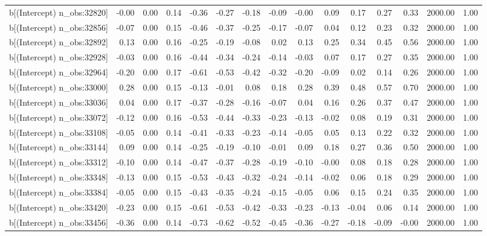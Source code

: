 \begin{table}[ht]
\begin{tabular}{rrrrrrrrrrrrrrr}
  b[(Intercept) n\_obs:32820] & -0.00 & 0.00 & 0.14 & -0.36 & -0.27 & -0.18 & -0.09 & -0.00 & 0.09 & 0.17 & 0.27 & 0.33 & 2000.00 & 1.00 \\ 
  b[(Intercept) n\_obs:32856] & -0.07 & 0.00 & 0.15 & -0.46 & -0.37 & -0.25 & -0.17 & -0.07 & 0.04 & 0.12 & 0.23 & 0.32 & 2000.00 & 1.00 \\ 
  b[(Intercept) n\_obs:32892] & 0.13 & 0.00 & 0.16 & -0.25 & -0.19 & -0.08 & 0.02 & 0.13 & 0.25 & 0.34 & 0.45 & 0.56 & 2000.00 & 1.00 \\ 
  b[(Intercept) n\_obs:32928] & -0.03 & 0.00 & 0.16 & -0.44 & -0.34 & -0.24 & -0.14 & -0.03 & 0.07 & 0.17 & 0.27 & 0.35 & 2000.00 & 1.00 \\ 
  b[(Intercept) n\_obs:32964] & -0.20 & 0.00 & 0.17 & -0.61 & -0.53 & -0.42 & -0.32 & -0.20 & -0.09 & 0.02 & 0.14 & 0.26 & 2000.00 & 1.00 \\ 
  b[(Intercept) n\_obs:33000] & 0.28 & 0.00 & 0.15 & -0.13 & -0.01 & 0.08 & 0.18 & 0.28 & 0.39 & 0.48 & 0.57 & 0.70 & 2000.00 & 1.00 \\ 
  b[(Intercept) n\_obs:33036] & 0.04 & 0.00 & 0.17 & -0.37 & -0.28 & -0.16 & -0.07 & 0.04 & 0.16 & 0.26 & 0.37 & 0.47 & 2000.00 & 1.00 \\ 
  b[(Intercept) n\_obs:33072] & -0.12 & 0.00 & 0.16 & -0.53 & -0.44 & -0.33 & -0.23 & -0.13 & -0.02 & 0.08 & 0.19 & 0.31 & 2000.00 & 1.00 \\ 
  b[(Intercept) n\_obs:33108] & -0.05 & 0.00 & 0.14 & -0.41 & -0.33 & -0.23 & -0.14 & -0.05 & 0.05 & 0.13 & 0.22 & 0.32 & 2000.00 & 1.00 \\ 
  b[(Intercept) n\_obs:33144] & 0.09 & 0.00 & 0.14 & -0.25 & -0.19 & -0.10 & -0.01 & 0.09 & 0.18 & 0.27 & 0.36 & 0.50 & 2000.00 & 1.00 \\ 
  b[(Intercept) n\_obs:33312] & -0.10 & 0.00 & 0.14 & -0.47 & -0.37 & -0.28 & -0.19 & -0.10 & -0.00 & 0.08 & 0.18 & 0.28 & 2000.00 & 1.00 \\ 
  b[(Intercept) n\_obs:33348] & -0.13 & 0.00 & 0.15 & -0.53 & -0.43 & -0.32 & -0.24 & -0.14 & -0.02 & 0.06 & 0.18 & 0.29 & 2000.00 & 1.00 \\ 
  b[(Intercept) n\_obs:33384] & -0.05 & 0.00 & 0.15 & -0.43 & -0.35 & -0.24 & -0.15 & -0.05 & 0.06 & 0.15 & 0.24 & 0.35 & 2000.00 & 1.00 \\ 
  b[(Intercept) n\_obs:33420] & -0.23 & 0.00 & 0.15 & -0.61 & -0.53 & -0.42 & -0.33 & -0.23 & -0.13 & -0.04 & 0.06 & 0.14 & 2000.00 & 1.00 \\ 
  b[(Intercept) n\_obs:33456] & -0.36 & 0.00 & 0.14 & -0.73 & -0.62 & -0.52 & -0.45 & -0.36 & -0.27 & -0.18 & -0.09 & -0.00 & 2000.00 & 1.00 \\ 

\end{tabular}
\end{table}

